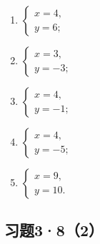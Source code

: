\begin{enumerate}[start=1]
\item
  \(\left\{ \begin{array}{l} x = 4, \\ y = 6; \end{array} \right.\)
\item
  \(\left\{ \begin{array}{l} x = 3, \\ y = -3; \end{array} \right.\)
\item
  \(\left\{ \begin{array}{l} x = 4, \\ y = -1; \end{array} \right.\)
\item
  \(\left\{ \begin{array}{l} x = 4, \\ y = -5; \end{array} \right.\)
\item
  \(\left\{ \begin{array}{l} x = 9, \\ y = 10. \end{array} \right.\)
\end{enumerate}

\subsection{习题3·8（2）}

